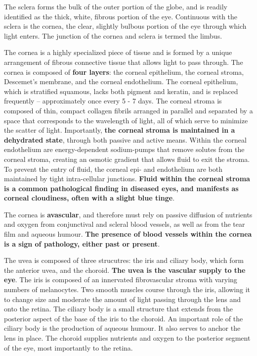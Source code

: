 \documentclass[openany]{book}
\begin{document}
The sclera forms the bulk of the outer portion of the globe, and is
readily identified as the thick, white, fibrous portion of the eye.
Continuous with the sclera is the cornea, the clear, slightly bulbous
portion of the eye through which light enters. The junction of the
cornea and sclera is termed the limbus.

The cornea is a highly specialized piece of tissue and is formed by a
unique arrangement of fibrous connective tissue that allows light to
pass through. The cornea is composed of \textbf{four layers}: the
corneal epithelium, the corneal stroma, Descemet's membrane, and the
corneal endothelium. The corneal epithelium, which is stratified
squamous, lacks both pigment and keratin, and is replaced frequently --
approximately once every 5 - 7 days. The corneal stroma is composed of
thin, compact collagen fibrils arranged in parallel and separated by a
space that corresponds to the wavelength of light, all of which serve to
minimize the scatter of light. Importantly, \textbf{the corneal stroma
is maintained in a dehydrated state}, through both passive and active
means. Within the corneal endothelium are energy-dependent sodium-pumps
that remove solutes from the corneal stroma, creating an osmotic
gradient that allows fluid to exit the stroma. To prevent the entry of
fluid, the corneal epi- and endothelium are both maintained by tight
intra-cellular junctions. \textbf{Fluid within the corneal stroma is a
common pathological finding in diseased eyes, and manifests as corneal
cloudiness, often with a slight blue tinge}.

The cornea is \textbf{avascular}, and therefore must rely on passive
diffusion of nutrients and oxygen from conjunctival and scleral blood
vessels, as well as from the tear film and aqueous humour. \textbf{The
presence of blood vessels within the cornea is a sign of pathology,
either past or present}.

The uvea is composed of three strucutres: the iris and ciliary body,
which form the anterior uvea, and the choroid. \textbf{The uvea is the
vascular supply to the eye}. The iris is composed of an innervated
fibrovascular stroma with varying numbers of melanocytes. Two smooth
muscles course through the iris, allowing it to change size and moderate
the amount of light passing through the lens and onto the retina. The
ciliary body is a small structure that extends from the posterior aspect
of the base of the iris to the choroid. An important role of the ciliary
body is the production of aqueous humour. It also serves to anchor the
lens in place. The choroid supplies nutrients and oxygen to the
posterior segment of the eye, most importantly to the retina.
\end{document}
